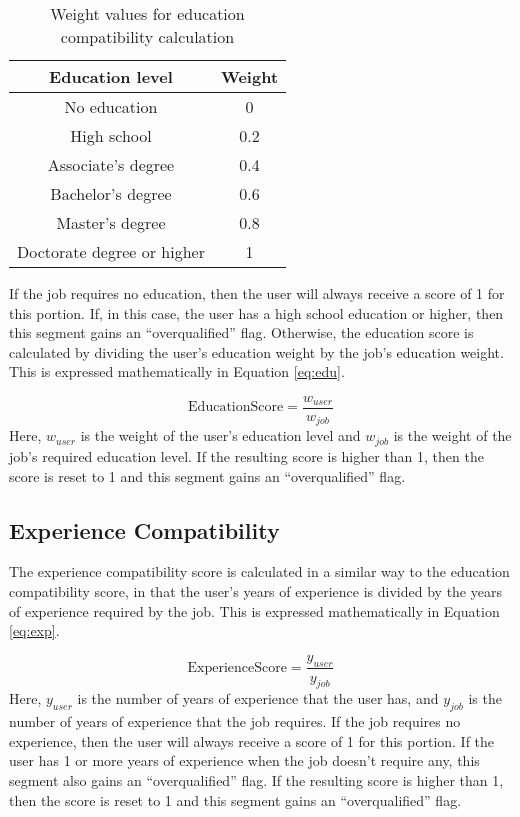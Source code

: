 \documentclass{article}
\begin{document}
\begin{table}[ht]
    \centering
    \begin{tabular}{|c|c|}
        \hline
        Education level & Weight \\
        \hline
        No education & 0 \\
        High school & 0.2 \\
        Associate's degree & 0.4 \\
        Bachelor's degree & 0.6 \\
        Master's degree & 0.8 \\
        Doctorate degree or higher & 1 \\
        \hline
    \end{tabular}
    \caption{Weight values for education compatibility calculation}
    \label{tab:weights}
\end{table}

If the job requires no education, then the user will always receive a score of 1 for this portion. If, in this case, the user has a high school education or higher, then this segment gains an ``overqualified'' flag. Otherwise, the education score is calculated by dividing the user's education weight by the job's education weight. This is expressed mathematically in Equation \ref{eq:edu}.

\begin{equation}
    \text{EducationScore} = \frac{w_{user}}{w_{job}}
    \label{eq:edu}
\end{equation}
Here, $w_{user}$ is the weight of the user's education level and $w_{job}$ is the weight of the job's required education level. If the resulting score is higher than 1, then the score is reset to 1 and this segment gains an ``overqualified'' flag.

\subsection{Experience Compatibility}

The experience compatibility score is calculated in a similar way to the education compatibility score, in that the user's years of experience is divided by the years of experience required by the job. This is expressed mathematically in Equation \ref{eq:exp}.

\begin{equation}
    \text{ExperienceScore} = \frac{y_{user}}{y_{job}}
    \label{eq:exp}
\end{equation}
Here, $y_{user}$ is the number of years of experience that the user has, and $y_{job}$ is the number of years of experience that the job requires. If the job requires no experience, then the user will always receive a score of 1 for this portion. If the user has 1 or more years of experience when the job doesn't require any, this segment also gains an ``overqualified'' flag. If the resulting score is higher than 1, then the score is reset to 1 and this segment gains an ``overqualified'' flag.
\end{document}
